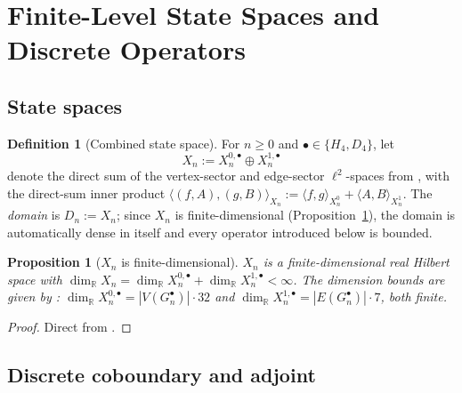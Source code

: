 \documentclass[11pt, a4paper]{amsart}
\newtheorem{proposition}[theorem]{Proposition}
\theoremstyle{definition}
\newtheorem{definition}[theorem]{Definition}
\newcommand{\R}{\mathbb{R}}
\begin{document}
\section{Finite-Level State Spaces and Discrete Operators}
\label{sec:operators}

\subsection{State spaces}

\begin{definition}[Combined state space]
\label{def:Xn}
For $n \geq 0$ and $\bullet \in \{H_4, D_4\}$, let
\[
  X_n := X_n^{0, \bullet} \oplus X_n^{1, \bullet}
\]
denote the direct sum of the vertex-sector and edge-sector
$\ell^2$-spaces from
\cite[Definitions~\texttt{def:Xn-0} and~\texttt{def:Xn-1}]{RefinementSpaces}, with
the direct-sum inner product
$\langle (f, A), (g, B) \rangle_{X_n} := \langle f, g
\rangle_{X_n^0} + \langle A, B \rangle_{X_n^1}$.
The \emph{domain} is $D_n := X_n$; since $X_n$ is
finite-dimensional (Proposition~\ref{prop:Xn-finite}), the domain
is automatically dense in itself and every operator introduced
below is bounded.
\end{definition}

\begin{proposition}[$X_n$ is finite-dimensional]
\label{prop:Xn-finite}
$X_n$ is a finite-dimensional real Hilbert space with
$\dim_\R X_n = \dim_\R X_n^{0, \bullet} + \dim_\R X_n^{1, \bullet}
< \infty$. The dimension bounds are given by
\cite[Proposition~\texttt{prop:Xn-Hilbert}]{RefinementSpaces}:
$\dim_\R X_n^{0, \bullet} = |V(G_n^\bullet)| \cdot 32$ and
$\dim_\R X_n^{1, \bullet} = |E(G_n^\bullet)| \cdot 7$, both
finite.
\end{proposition}

\begin{proof}
Direct from \cite[Proposition~\texttt{prop:Xn-Hilbert}]{RefinementSpaces}.
\end{proof}

\subsection{Discrete coboundary and adjoint}
\end{document}
